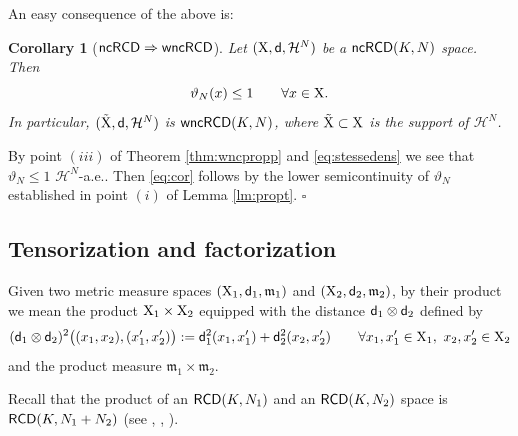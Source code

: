 \documentclass[reqno,11pt]{article}
\numberwithin{equation}{section}
\newcommand{\mm}{{\mbox{\boldmath$m$}}}
\newcommand{\sfd}{{\sf d}}
\renewcommand{\mm}{\mathfrak m}                                %
\renewenvironment{proof}{\removelastskip\par\medskip   %
\noindent{\em Proof} \rm}{\penalty-20\null\hfill$\square$\par\medbreak}
\newtheorem{corollary}[theorem]{Corollary}
\newcommand{\X}{{\rm X}}
\newcommand{\RCD}{{\sf RCD}}
\newcommand{\ncRCD}{{\sf ncRCD}}
\newcommand{\wncRCD}{{\sf wncRCD}}
\newcommand{\HH}{{\mathcal H}}
\begin{document}
An easy consequence of the above is:
\begin{corollary}[$\ncRCD\Rightarrow\wncRCD$]\label{cor:densnc}
Let $(\X,\sfd,\HH^N)$ be  a $\ncRCD(K,N)$ space. Then
\begin{equation}
\label{eq:cor}
\vartheta_N(x)\leq 1\qquad\forall x\in\X.
\end{equation}
In particular, {$(\tilde\X,\sfd,\HH^N)$} is $\wncRCD(K,N)${, where $\tilde \X\subset \X$ is the support of $\HH^N$}.
\end{corollary}
\begin{proof}
By point $(iii)$ of Theorem \ref{thm:wncpropp} and \eqref{eq:stessedens} we see that $\vartheta_N\leq 1$ $\HH^N$-a.e.. Then { \eqref{eq:cor}} follows by the lower semicontinuity of $\vartheta_N$ established in point $(i)$ of Lemma \ref{lm:propt}. \end{proof}



\subsection{Tensorization and factorization}
Given two metric measure spaces $(\X_1,\sfd_1,\mm_1)$ and $(\X_2,\sfd_2,\mm_2)$, by their product we mean the product  $\X_1\times\X_2$ equipped with the distance $\sfd_1\otimes\sfd_2$ defined by
\[
(\sfd_1\otimes\sfd_2)^2\big((x_1,x_2),(x_1',x_2')\big):=\sfd_1^2(x_1,x_1')+\sfd_2^2(x_2,x_2')\qquad \forall x_1,x_1'\in\X_1,\ x_2,x_2'\in\X_2
\]
and the product measure $\mm_1\times\mm_2$.

Recall that the product of an $\RCD(K,N_1)$ and an $\RCD(K,N_2)$ space is  $\RCD(K,N_1+N_2)$  (see \cite{Sturm06II}, \cite{AmbrosioGigliSavare11-2}, \cite{AmbrosioGigliSavare12}).
\end{document}
